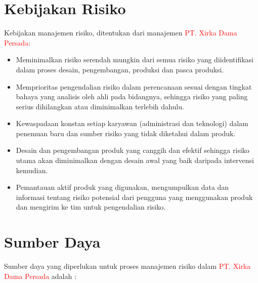 \documentclass[11pt,a4paper,twoside,draft,onecolumn]{book}
\begin{document}
		\section{Kebijakan Risiko}
		Kebijakan manajemen risiko, ditentukan dari manajemen \textcolor{red}{PT. Xirka Dama Persada}:
		\begin{itemize}
			\item Meminimalkan risiko serendah mungkin dari semua risiko yang diidentifikasi dalam proses desain, pengembangan, produksi dan pasca produksi.
			\item Memprioritas pengendalian risiko dalam perencanaan sesuai dengan tingkat bahaya yang analisis oleh ahli pada bidangnya, sehingga risiko yang paling serius dihilangkan atau diminimalkan terlebih dahulu.
			\item Kewaspadaan konstan setiap karyawan (administrasi dan teknologi) dalam penemuan baru dan sumber risiko yang tidak diketahui dalam produk.
			\item Desain dan pengembangan produk yang canggih dan efektif sehingga risiko utama akan diminimalkan dengan desain awal yang baik daripada intervensi kemudian.
			\item Pemantauan aktif produk yang digunakan, mengumpulkan data dan informasi tentang risiko potensial dari pengguna yang menggunakan produk dan mengirim ke tim untuk pengendalian risiko.
		\end{itemize}
		
		\section{Sumber Daya}
		Sumber daya yang diperlukan untuk proses manajemen risiko dalam \textcolor{red}{PT. Xirka Dama Persada} adalah :
		
\end{document}
